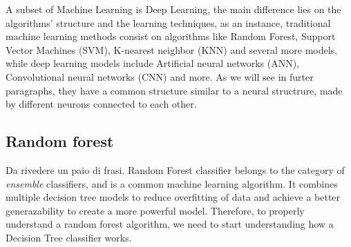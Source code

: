 \documentclass[a4paper,11pt]{article}
\begin{document}
A subset of Machine Learning is Deep Learning, the main difference lies on the algorithms' structure and the learning techniques, as an instance, traditional machine learning methods consist on algorithms like Random Forest, Support Vector Machines (SVM), K-nearest neighbor (KNN) and several more models, while deep learning models include Artificial neural networks (ANN), Convolutional neural networks (CNN) and more.
As we will see in furter paragraphs, they have a common structure similar to a neural structrure, made by different neurons connected to each other.




\subsection{Random forest}
Da rivedere un paio di frasi.
Random Forest classifier belongs to the category of \emph{ensemble} classifiers, and is a common machine learning algorithm.
It combines multiple decision tree models to reduce overfitting of data and achieve a better generazability to create a more powerful model.
Therefore, to properly understand a random forest algorithm, we need to start understanding how a Decision Tree classifier works.
\end{document}
